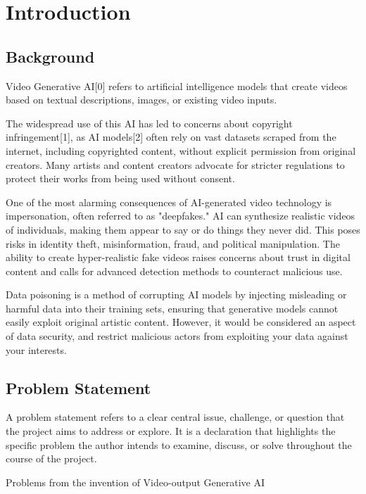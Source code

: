 \chapter{Introduction}
\label{chap:introduction}

\section{Background}
\label{section:background}

Video Generative AI[0] refers to artificial intelligence models that create videos based on textual descriptions, images, or existing video inputs. 

The widespread use of this AI has led to concerns about copyright infringement[1], as AI models[2] often rely on vast datasets scraped from the internet, including copyrighted content, without explicit permission from original creators. Many artists and content creators advocate for stricter regulations to protect their works from being used without consent.

One of the most alarming consequences of AI-generated video technology is impersonation, often referred to as "deepfakes." AI can synthesize realistic videos of individuals, making them appear to say or do things they never did. This poses risks in identity theft, misinformation, fraud, and political manipulation. The ability to create hyper-realistic fake videos raises concerns about trust in digital content and calls for advanced detection methods to counteract malicious use.

Data poisoning is a method of corrupting AI models by injecting misleading or harmful data into their training sets, ensuring that generative models cannot easily exploit original artistic content. However, it would be considered an aspect of data security, and restrict malicious actors from exploiting your data against your interests.

\section{Problem Statement}
\label{section:problem-statement}

A problem statement refers to a clear central issue,
challenge, or question that the project aims to address or explore. It is a
declaration that highlights the specific problem the author intends to examine,
discuss, or solve throughout the course of the project.

Problems from the invention of Video-output Generative AI

